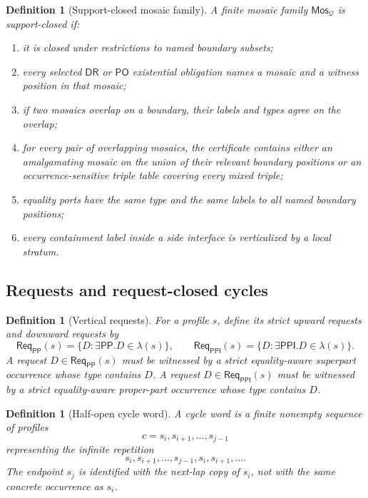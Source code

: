 \documentclass[11pt]{article}
\newtheorem{definition}[theorem]{Definition}
\newcommand{\DR}{\mathsf{DR}}
\newcommand{\PO}{\mathsf{PO}}
\newcommand{\PP}{\mathsf{PP}}
\newcommand{\PPI}{\mathsf{PPI}}
\newcommand{\Q}{\mathcal Q}
\newcommand{\Mos}{\mathsf{Mos}}
\newcommand{\Req}{\mathsf{Req}}
\begin{document}
\begin{definition}[Support-closed mosaic family]\label{def:support-closed}
A finite mosaic family $\Mos_\Q$ is support-closed if:
\begin{enumerate}[label=(SC\arabic*)]
\item it is closed under restrictions to named boundary subsets;
\item every selected $\DR$ or $\PO$ existential obligation names a mosaic and a witness position in that mosaic;
\item if two mosaics overlap on a boundary, their labels and types agree on the overlap;
\item for every pair of overlapping mosaics, the certificate contains either an amalgamating mosaic on the union of their relevant boundary positions or an occurrence-sensitive triple table covering every mixed triple;
\item equality ports have the same type and the same labels to all named boundary positions;
\item every containment label inside a side interface is verticalized by a local stratum.
\end{enumerate}
\end{definition}

\subsection{Requests and request-closed cycles}

\begin{definition}[Vertical requests]\label{def:requests}
For a profile $s$, define its strict upward requests and downward requests by
\[
  \Req_\PP(s)=\{D: \exists\PP.D\in\lambda(s)\},
  \qquad
  \Req_\PPI(s)=\{D: \exists\PPI.D\in\lambda(s)\}.
\]
A request $D\in\Req_\PP(s)$ must be witnessed by a strict equality-aware superpart occurrence whose type contains $D$.  A request $D\in\Req_\PPI(s)$ must be witnessed by a strict equality-aware proper-part occurrence whose type contains $D$.
\end{definition}

\begin{definition}[Half-open cycle word]\label{def:cycle-word}
A cycle word is a finite nonempty sequence of profiles
\[
   c=s_i,s_{i+1},\ldots,s_{j-1}
\]
representing the infinite repetition
\[
   s_i,s_{i+1},\ldots,s_{j-1},s_i,s_{i+1},\ldots.
\]
The endpoint $s_j$ is identified with the next-lap copy of $s_i$, not with the same concrete occurrence as $s_i$.
\end{definition}
\end{document}
